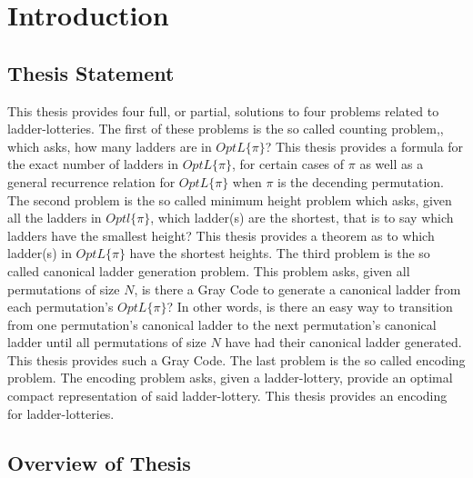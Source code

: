 



\chapter{Introduction}
\label{chapter:intro}



\section{Thesis Statement}
    This thesis provides four full, or partial, solutions to four problems related 
    to ladder-lotteries. The first of these problems is the so called counting problem,, 
    which asks, how many ladders are in $OptL\{\pi\}$? This thesis provides 
    a formula for the exact number of ladders in $OptL\{\pi\}$, for certain 
    cases of $\pi$ as well as a general recurrence relation for $OptL\{\pi\}$
    when $\pi$ is the decending permutation. The second problem is the so called minimum height 
    problem which asks, given all the ladders in $Optl\{\pi\}$, which ladder(s) are 
    the shortest, that is to say which ladders have the smallest height? This thesis 
    provides a theorem as to which ladder(s) in $OptL\{\pi\}$ have the shortest heights.
    The third problem is the so called canonical ladder generation problem. 
    This problem asks, given all permutations of size $N$, is there a Gray Code 
    to generate a canonical ladder from each permutation's $OptL\{\pi\}$? In other words, 
    is there an easy way to transition from one permutation's canonical ladder to the next 
    permutation's canonical ladder until all permutations of size $N$ have had their canonical 
    ladder generated. This thesis provides such a Gray Code. The last problem is the so called encoding problem.
    The encoding problem asks, given a ladder-lottery, provide an optimal compact 
    representation of said ladder-lottery. This thesis provides an encoding for ladder-lotteries.
\section{Overview of Thesis}  

